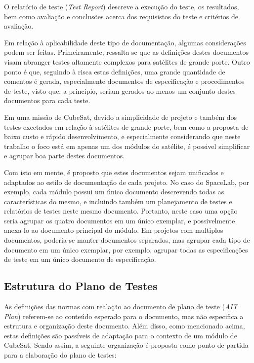 O relatório de teste (\textit{Test Report}) descreve a execução do teste, os resultados, bem como avaliação e conclusões acerca dos requisistos do teste e critérios de avaliação.


Em relação à aplicabilidade deste tipo de documentação, algumas considerações podem ser feitas.
Primeiramente, ressalta-se que as definições destes documentos visam abranger testes altamente complexos para satélites de grande porte.
Outro ponto é que, seguindo à risca estas definições, uma grande quantidade de comentos é gerada, especialmente documentos de especificação e procedimentos de teste, visto que, a princípio, seriam gerados ao menos um conjunto destes documentos para cada teste.

Em uma missão de CubeSat, devido a simplicidade de projeto e também dos testes exectados em relação à satélites de grande porte, bem como a proposta de baixo custo e rápido desenvolvimento, e especialmente considerando que neste trabalho o foco está em apenas um dos módulos do satélite, é possivel simplificar e agrupar boa parte destes documentos.

Com isto em mente, é proposto que estes documentos sejam unificados e adaptados ao estilo de documentação de cada projeto.
No caso do SpaceLab, por exemplo, cada módulo possui um único documento descrevendo todas as características do mesmo, e incluindo também um planejamento de testes e relatórios de testes neste mesmo documento. Portanto, neste caso uma opção seria agrupar os quatro documentos em um único exemplar, e possivelmente anexa-lo ao documento principal do módulo.
Em projetos com multiplos documentos, poderia-se manter documentos separados, mas agrupar cada tipo de documento em um único exemplar, por exemplo, agrupar todas as especificações de teste em um único documento de especificação.


\subsection{Estrutura do Plano de Testes} \label{sec:estrutura-plano-testes}


As definições das normas com realação ao documento de plano de teste (\textit{AIT Plan}) referem-se ao conteúdo esperado para o documento, mas não especifica a estrutura e organização deste documento.
Além disso, como mencionado acima, estas definições são passíveis de adaptação para o contexto de um módulo de CubeSat.
Sendo assim, a seguinte organização é proposta como ponto de partida para a elaboração do plano de testes:

